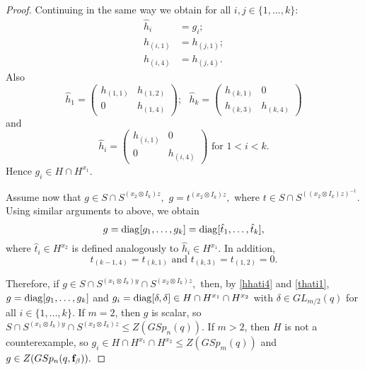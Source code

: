 \begin{proof}
Continuing in the same way we obtain for all $i,j \in \{1, \ldots, k\}:$
\begin{equation}\label{hhati4}
\begin{split}
\hat{h}_i&=g_i;\\
h_{(i,1)}&=h_{(j,1)};\\
h_{(i,4)}&=h_{(j,4)}.
\end{split}
\end{equation} 
Also $$
\hat{h}_1 = \begin{pmatrix} h_{(1,1)} & h_{(1,2)} \\ 0& h_{(1,4)}\end{pmatrix}; \text{ }
\hat{h}_k = \begin{pmatrix} h_{(k,1)} & 0 \\ h_{(k,3)} & h_{(k,4)}\end{pmatrix}$$ { and }
$$\hat{h}_i = \begin{pmatrix} h_{(i,1)} & 0 \\ 0 & h_{(i,4)}\end{pmatrix} \text{ for } 1<i<k. 
$$ Hence $g_i \in H \cap H^{x_1}.$ 

Assume now that $g \in S \cap S^{(x_2 \otimes I_k)z},$ $g=t^{(x_2 \otimes I_k)z},$ where $t \in S \cap S^{((x_2 \otimes I_k)z)^{-1}}.$ Using similar arguments to above, we obtain 
$$g=\mathrm{diag} [g_1, \ldots, g_k]= \mathrm{diag}[\hat{t}_1, \ldots, \hat{t}_k],$$
where $\hat{t}_i \in H^{x_2}$ is defined analogously to $\hat{h}_i \in H^{x_1}.$ In addition,
\begin{equation}\label{thati1}
 t_{(k-1,4)}=t_{(k,1)} \text{ and } t_{(k,3)}=t_{(1,2)}=0.
\end{equation}


Therefore, if $g \in S \cap S^{(x_1 \otimes I_k)y} \cap S^{(x_2 \otimes I_k)z},$ then, by \eqref{hhati4} and \eqref{thati1},  $g = \mathrm{diag}[g_1, \ldots, g_k]$ and $g_i= \mathrm{diag}[\delta,\delta] \in  H \cap H^{x_1} \cap H^{x_2}$  with $\delta \in GL_{m/2}(q)$ for all $ i \in \{1, \ldots, k\}.$ If $m=2$, then $g$ is scalar, so
$S \cap S^{(x_1 \otimes I_k)y} \cap S^{(x_2 \otimes I_k)z}\le Z(GSp_n(q))$.
If $m>2$, then $H$ is not a counterexample, so  $g_i \in H \cap H^{x_1} \cap H^{x_2} \le Z(GSp_m(q))$ and $g \in Z(GSp_n(q, {\bf f}_{\beta})).$

\medskip


\end{proof}
